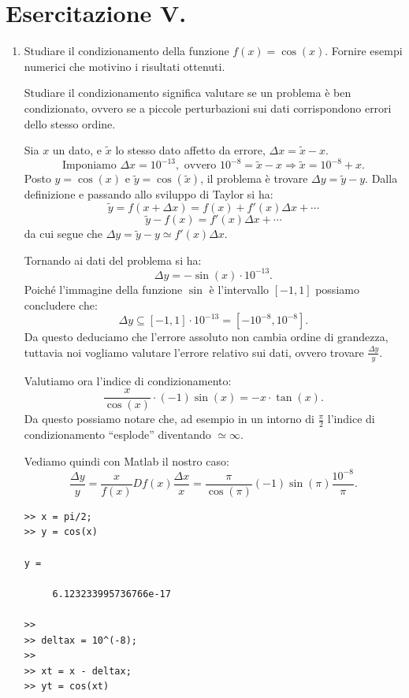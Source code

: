 \section{Esercitazione V.}

\begin{enumerate}

\item Studiare il condizionamento della funzione $f(x) = \cos(x)$. Fornire
esempi numerici che motivino i risultati ottenuti.

\begin{svol}
Studiare il condizionamento significa valutare se un problema è ben
condizionato, ovvero se a piccole perturbazioni sui dati corrispondono
errori dello stesso ordine.

Sia $x$ un dato, e $\tilde{x}$ lo stesso dato affetto da errore, $\Delta x =
\tilde{x}-x$.
\[
\textrm{Imponiamo } \Delta x = 10^{-13}, \textrm{ ovvero } 10^{-8} = \tilde{x} 
- x \Rightarrow \tilde{x} = 10^{-8} +x.
\]
Posto $y = \cos(x)$ e $\tilde{y} = \cos(\tilde{x})$, il problema è
trovare $\Delta y = \tilde{y} - y$. Dalla definizione e passando allo sviluppo
di Taylor si ha:
\[
\tilde{y} = f(x + \Delta x) = f(x) + f'(x)\Delta x + \cdots
\]
\[\tilde{y} - f(x) = f'(x)\Delta x + \cdots \]
da cui segue che $\Delta y = \tilde{y} - y \simeq f'(x)\Delta x$.

Tornando ai dati del problema si ha:
\[\Delta y = -\sin(x)\cdot 10^{-13}.\]
Poiché l'immagine della funzione $\sin$ è l'intervallo $[-1,1]$ possiamo
concludere che:
\[
\Delta y \subseteq [-1,1]\cdot 10^{-13} = [-10^{-8},10^{-8}].
\]
Da questo deduciamo che l'errore assoluto non cambia ordine di grandezza,
tuttavia noi vogliamo valutare l'errore relativo sui dati, ovvero trovare
$\frac{\Delta y}{y}$.

Valutiamo ora l'indice di condizionamento:
\[\frac{x}{\cos(x)}\cdot (-1)\sin(x) = -x \cdot \tan(x).\]
Da questo possiamo notare che, ad esempio in un intorno di $\frac{\pi}{2}$ 
l'indice di condizionamento ``esplode'' diventando $\simeq \infty$.

Vediamo quindi con Matlab il nostro caso:
\[
\frac{\Delta y}{y} = \frac{x}{f(x)}Df(x)\frac{\Delta x}{x} = 
\frac{\pi}{\cos(\pi)}(-1)\sin(\pi)\frac{10^{-8}}{\pi}.
\]
\begin{codice}
\begin{verbatim}
>> x = pi/2;
>> y = cos(x)

y =

     6.123233995736766e-17

>> 
>> deltax = 10^(-8);
>> 
>> xt = x - deltax;
>> yt = cos(xt)


\end{verbatim}
\end{codice}
\end{svol}
\end{enumerate}
